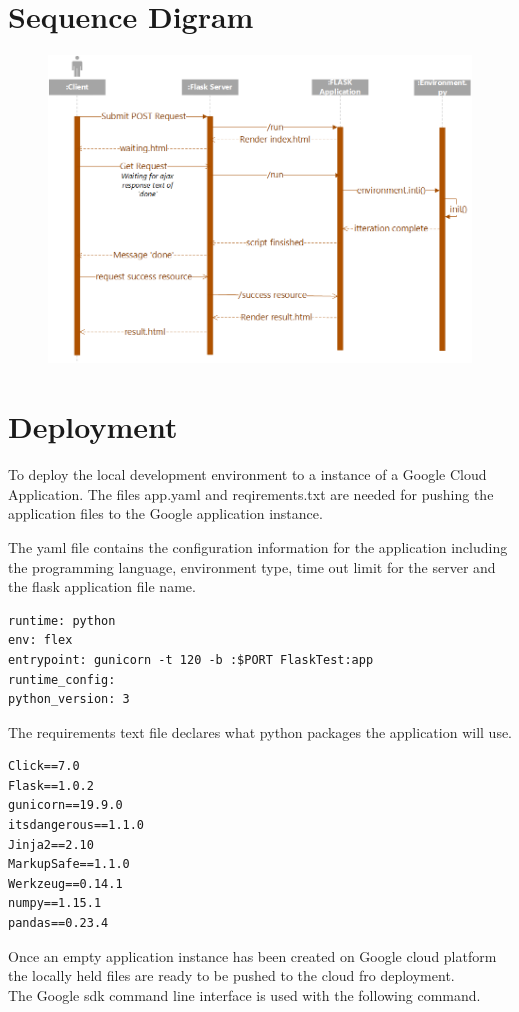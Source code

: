 \section{Sequence Digram}
\begin{figure}[H]
	\centering
	\includegraphics[width=1.2\linewidth]{img/sequence}
	\caption{}
	\label{fig:sequence}
\end{figure}


\section{Deployment}
To deploy the local development environment to a instance of a Google Cloud Application.
The files app.yaml and reqirements.txt are needed for pushing the application files to the Google application instance.

The yaml file contains the configuration information for the application including the programming language, environment type, time out limit for the server and the flask application file name.
\begin{verbatim}
runtime: python
env: flex
entrypoint: gunicorn -t 120 -b :$PORT FlaskTest:app
runtime_config:
python_version: 3
\end{verbatim}
The requirements text file declares what python packages the application will use.
\begin{verbatim}
Click==7.0
Flask==1.0.2
gunicorn==19.9.0
itsdangerous==1.1.0
Jinja2==2.10
MarkupSafe==1.1.0
Werkzeug==0.14.1
numpy==1.15.1
pandas==0.23.4
\end{verbatim}
Once an empty application instance has been created on Google cloud platform the locally held files are ready to be pushed to the cloud fro deployment.\\
The Google sdk command line interface is used with the following command.


